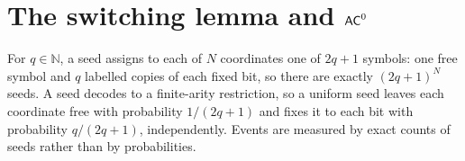\section{The switching lemma and $\mathsf{AC}^0$}
\label{sec:lowerbounds-ac0}

\begin{definition}
  \label{def:lowerbounds-random-restriction}
  \leanok
  For $q \in \mathbb{N}$, a seed assigns to each of $N$ coordinates one of
  $2q + 1$ symbols: one free symbol and $q$ labelled copies of each fixed bit,
  so there are exactly $(2q + 1)^N$ seeds. A seed decodes to a finite-arity
  restriction, so a uniform seed leaves each coordinate free with probability
  $1/(2q+1)$ and fixes it to each bit with probability $q/(2q+1)$,
  independently. Events are measured by exact counts of seeds rather than by
  probabilities.
\end{definition}

